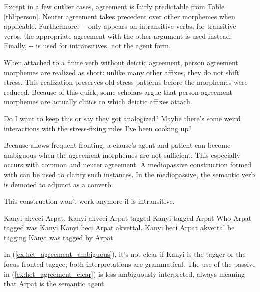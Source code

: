 Except in a few outlier cases, agreement is fairly predictable from Table \ref{tbl:person}. Neuter agreement takes precedent over other morphemes when applicable. Furthermore, -- only appears on intransitive verbs; for transitive verbs, the appropriate agreement with the other argument is used instead. Finally, -- is used for intransitives, not the agent form.

When attached to a finite verb without deictic agreement, person agreement morphemes are realized as short: unlike many other affixes, they do not shift stress. This realization preserves old stress patterns before the morphemes were reduced. Because of this quirk, some scholars argue that person agreement morphemes are actually clitics to which deictic affixes attach.

\begin{kaobox}[frametitle=\sc todo:]
	Do I want to keep this or say they got analogized? Maybe there's some weird interactions with the stress-fixing rules I've been cooking up?
\end{kaobox}

Because \langname{} allows frequent fronting, a clause's agent and patient can become ambiguous when the agreement morphemes are not sufficient. This especially occurs with common and neuter agreement. A mediopassive construction formed with  can be used to clarify such instances. In the mediopassive, the semantic verb is demoted to adjunct as a converb.

\begin{kaobox}[frametitle=\sc todo:]
	This construction won't work anymore if  is intransitive.
\end{kaobox}

\begin{examples*}
	\ex \label{ex:het_agreement_ambiguous}
		\script Kanyi akveci Arpat.
		\bits Kanyi akveci Arpat
		\gloss {} tagged 
		\tr Kanyi tagged Arpat
		\alt Who Arpat tagged was Kanyi
	\ex \label{ex:het_agreement_clear}
		\script Kanyi heci Arpat akvettal.
		\bits Kanyi heci Arpat akvettal
		\gloss {} be  tagging
		\tr Kanyi was tagged by Arpat
\end{examples*}

In (\ref{ex:het_agreement_ambiguous}), it's not clear if Kanyi is the tagger or the focus-fronted taggee; both interpretations are grammatical. The use of the passive in (\ref{ex:het_agreement_clear}) is less ambiguously interpreted, always meaning that Arpat is the semantic agent.

